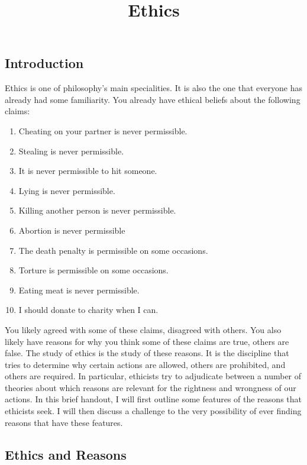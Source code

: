 \documentclass[]{article}
\title{Ethics}
\date{}
\begin{document}
\maketitle

\subsection{Introduction}\label{introduction}

Ethics is one of philosophy's main specialities. It is also the one that
everyone has already had some familiarity. You already have ethical
beliefs about the following claims:

\begin{enumerate}
\def\labelenumi{\arabic{enumi}.}
\itemsep1pt\parskip0pt
\item
  Cheating on your partner is never permissible.
\item
  Stealing is never permissible.\\
\item
  It is never permissible to hit someone.
\item
  Lying is never permissible.
\item
  Killing another person is never permissible.
\item
  Abortion is never permissible
\item
  The death penalty is permissible on some occasions.
\item
  Torture is permissible on some occasions.
\item
  Eating meat is never permissible.\\
\item
  I should donate to charity when I can.
\end{enumerate}

You likely agreed with some of these claims, disagreed with others. You
also likely have reasons for why you think some of these claims are
true, others are false. The study of ethics is the study of these
reasons. It is the discipline that tries to determine why certain
actions are allowed, others are prohibited, and others are required. In
particular, ethicists try to adjudicate between a number of theories
about which reasons are relevant for the rightness and wrongness of our
actions. In this brief handout, I will first outline some features of
the reasons that ethicists seek. I will then discuss a challenge to the
very possibility of ever finding reasons that have these features.

\subsection{Ethics and Reasons}\label{ethics-and-reasons}
\end{document}
